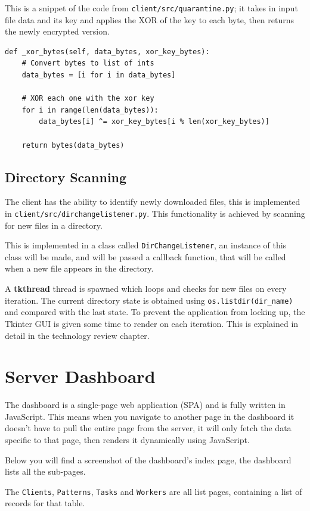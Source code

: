 This is a snippet of the code from \texttt{client/src/quarantine.py};
it takes in input file data and its key and applies the XOR of the key to each byte,
then returns the newly encrypted version.

\begin{lstlisting}
def _xor_bytes(self, data_bytes, xor_key_bytes):
    # Convert bytes to list of ints
    data_bytes = [i for i in data_bytes]

    # XOR each one with the xor key
    for i in range(len(data_bytes)):
        data_bytes[i] ^= xor_key_bytes[i % len(xor_key_bytes)]

    return bytes(data_bytes)
\end{lstlisting}

\subsection{Directory Scanning}
The client has the ability to identify newly downloaded files,
this is implemented in \texttt{client/src/dirchangelistener.py}.
This functionality is achieved by scanning for new files in a directory.

This is implemented in a class called \texttt{DirChangeListener},
an instance of this class will be made, and will be passed a callback function,
that will be called when a new file appears in the directory.

A \textbf{tkthread} thread is spawned which loops
and checks for new files on every iteration.
The current directory state is obtained using
\texttt{os.listdir(dir\_name)} and compared with the last state.
To prevent the application from locking up,
the Tkinter GUI is given some time to render on each iteration.
This is explained in detail in the technology review chapter.

\section{Server Dashboard}
The dashboard is a single-page web application (SPA)
and is fully written in JavaScript.
This means when you navigate to another page in the dashboard
it doesn't have to pull the entire page from the server,
it will only fetch the data specific to that page,
then renders it dynamically using JavaScript.

Below you will find a screenshot of the dashboard's index page,
the dashboard lists all the sub-pages.

The \texttt{Clients}, \texttt{Patterns}, \texttt{Tasks} and \texttt{Workers} are all
list pages, containing a list of records for that table.

